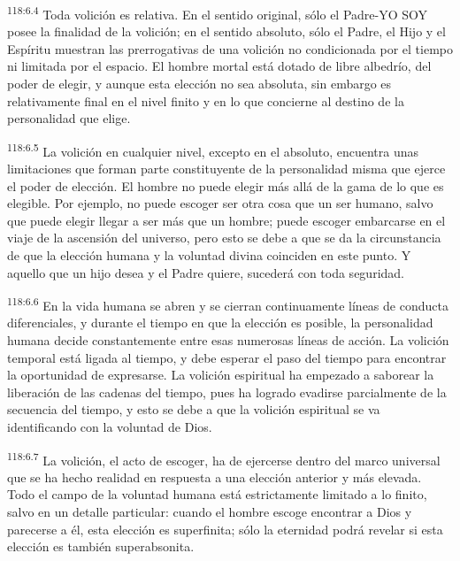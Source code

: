 \documentclass[twoside, 11pt]{book}
\begin{document}
\par
\textsuperscript{118:6.4} Toda volición es relativa. En el sentido original, sólo el Padre-YO SOY posee la finalidad de la volición; en el sentido absoluto, sólo el Padre, el Hijo y el Espíritu muestran las prerrogativas de una volición no condicionada por el tiempo ni limitada por el espacio. El hombre mortal está dotado de libre albedrío, del poder de elegir, y aunque esta elección no sea absoluta, sin embargo es relativamente final en el nivel finito y en lo que concierne al destino de la personalidad que elige.

\par
\textsuperscript{118:6.5} La volición en cualquier nivel, excepto en el absoluto, encuentra unas limitaciones que forman parte constituyente de la personalidad misma que ejerce el poder de elección. El hombre no puede elegir más allá de la gama de lo que es elegible. Por ejemplo, no puede escoger ser otra cosa que un ser humano, salvo que puede elegir llegar a ser más que un hombre; puede escoger embarcarse en el viaje de la ascensión del universo, pero esto se debe a que se da la circunstancia de que la elección humana y la voluntad divina coinciden en este punto. Y aquello que un hijo desea y el Padre quiere, sucederá con toda seguridad.

\par
\textsuperscript{118:6.6} En la vida humana se abren y se cierran continuamente líneas de conducta diferenciales, y durante el tiempo en que la elección es posible, la personalidad humana decide constantemente entre esas numerosas líneas de acción. La volición temporal está ligada al tiempo, y debe esperar el paso del tiempo para encontrar la oportunidad de expresarse. La volición espiritual ha empezado a saborear la liberación de las cadenas del tiempo, pues ha logrado evadirse parcialmente de la secuencia del tiempo, y esto se debe a que la volición espiritual se va identificando con la voluntad de Dios.

\par
\textsuperscript{118:6.7} La volición, el acto de escoger, ha de ejercerse dentro del marco universal que se ha hecho realidad en respuesta a una elección anterior y más elevada. Todo el campo de la voluntad humana está estrictamente limitado a lo finito, salvo en un detalle particular: cuando el hombre escoge encontrar a Dios y parecerse a él, esta elección es superfinita; sólo la eternidad podrá revelar si esta elección es también superabsonita.
\end{document}
